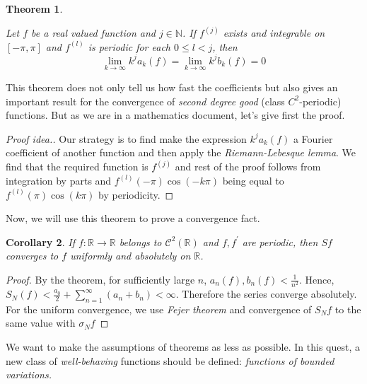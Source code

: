 \documentclass[12pt]{amsart}
\newtheorem{theorem}{Theorem}[section]
\newtheorem{corollary}[theorem]{Corollary}
\theoremstyle{definition}
\newcommand{\RR}{{\mathbb R}} %
\newcommand{\cC}{{\mathcal C}}
\begin{document}
\begin{theorem}\label{growth of coefficients in C^j}

    Let $f$ be a real valued function and $j \in \mathbb{N}$. If $f^{(j)}$ exists and integrable on $[-\pi,\pi]$ and $f^{(l)}$ is periodic for each $0 \leq l < j$, then
    \begin{equation}
        \lim_{k \to \infty} k^j a_k(f) = \lim_{k \to \infty} k^j b_k(f) = 0
    \end{equation}
\end{theorem}


This theorem does not only tell us how fast the coefficients but also gives an important result for the convergence of \textit{second degree good} (class $C^2$-periodic) functions. But as we are in a mathematics document, let's give first the proof.


\begin{proof}[Proof idea.]
    Our strategy is to find make the expression $k^ja_k(f)$ a Fourier coefficient of another function and then apply the \emph{Riemann-Lebesque lemma}. We find that the required function is $f^{(j)}$ and rest of the proof follows from integration by parts and $f^{(l)}(-\pi)\cos(-k\pi)$ being equal to $f^{(l)}(\pi)\cos(k\pi)$ by periodicity.
\end{proof}


Now, we will use this theorem to prove a convergence fact.


\begin{corollary}\label{C^2 converges}
    If $f: \RR \to \RR$ belongs to $\cC^2(\RR) $ and $f, f^{'}$ are periodic, then $Sf$ converges to $f$ uniformly and absolutely on $\RR$.
\end{corollary}


\begin{proof}
    By the theorem, for sufficiently large $n$, $a_n(f), b_n(f) < \frac{1}{n^2}$. Hence, $S_N(f) <  \frac{a_0}{2} + \sum_{n=1}^{\infty} \left(a_n + b_n\right) < \infty$. Therefore the series converge absolutely. For the uniform convergence, we use \textit{Fejer theorem} and convergence of $S_Nf$ to the same value with $\sigma_N f$ \footnotemark{}
\end{proof}


We want to make the assumptions of theorems as less as possible. In this quest, a new class of \emph{well-behaving} functions should be defined: \emph{functions of bounded variations.} 

\end{document}
